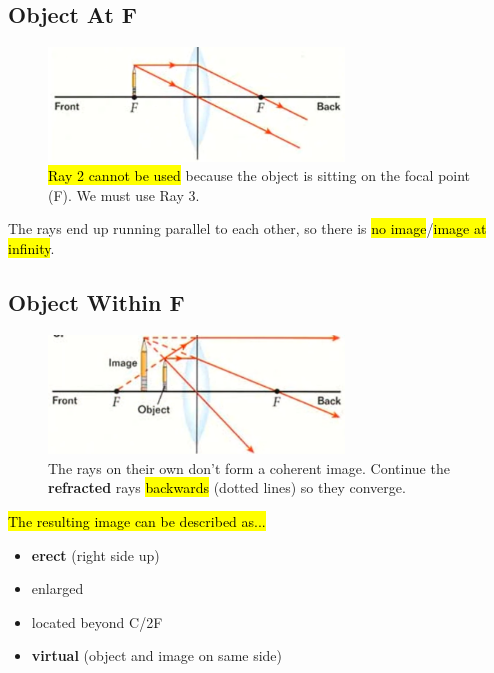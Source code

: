 \documentclass[a4paper,12pt]{article}
\begin{document}
\subsection{Object At F}
\begin{figure}[H]
    \centering
    \includegraphics[width=0.7\textwidth]{convex-atF}
    \caption{\hl{Ray 2 cannot be used} because the object is sitting on the focal point (F). We must use Ray 3.}
\end{figure}

The rays end up running parallel to each other, so there is \hl{no image}/\hl{image at infinity}.

\subsection{Object Within F}
\begin{figure}[H]
    \centering
    \includegraphics[width=0.7\textwidth]{convex-withinF}
    \caption{The rays on their own don't form a coherent image. Continue the \textbf{refracted} rays \hl{backwards} (dotted lines) so they converge.}
\end{figure}

\hl{The resulting image can be described as...}
\begin{itemize}
    \item{\textbf{erect} (right side up)}
    \item{enlarged}
    \item{located beyond C/2F}
    \item{\textbf{virtual} (object and image on same side)}
\end{itemize}

\pagebreak
\end{document}
